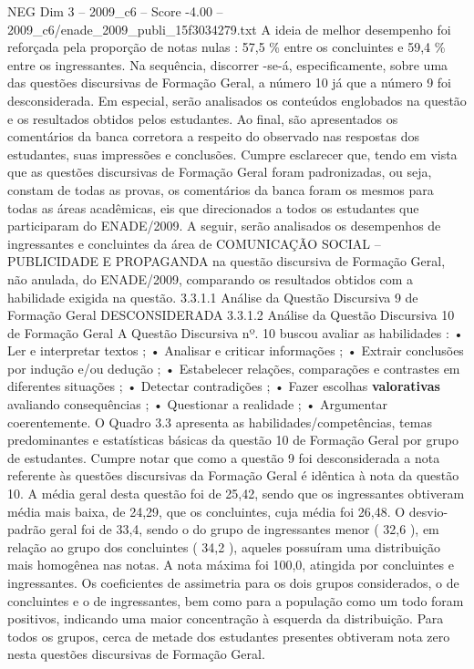 \begin{textsample}{NEG Dim 3 – 2009\_c6 – Score -4.00 – 2009\_c6/enade\_2009\_publi\_15f3034279.txt}
A ideia de melhor desempenho foi reforçada pela proporção de notas nulas : 57,5 \% entre os concluintes e 59,4 \% entre os ingressantes.
Na sequência, discorrer -se-á, especificamente, sobre uma das questões discursivas de Formação Geral, a número 10 já que a número 9 foi desconsiderada.
Em especial, serão analisados os conteúdos englobados na questão e os resultados obtidos pelos estudantes.
Ao final, são apresentados os comentários da banca corretora a respeito do observado nas respostas dos estudantes, suas impressões e conclusões.
Cumpre esclarecer que, tendo em vista que as questões discursivas de Formação Geral foram padronizadas, ou seja, constam de todas as provas, os comentários da banca foram os mesmos para todas as áreas acadêmicas, eis que direcionados a todos os estudantes que participaram do ENADE/2009.
A seguir, serão analisados os desempenhos de ingressantes e concluintes da área de COMUNICAÇÃO SOCIAL – PUBLICIDADE E PROPAGANDA na questão discursiva de Formação Geral, não anulada, do ENADE/2009, comparando os resultados obtidos com a habilidade exigida na questão. 3.3.1.1 Análise da Questão Discursiva 9 de Formação Geral DESCONSIDERADA 3.3.1.2 Análise da Questão Discursiva 10 de Formação Geral A Questão Discursiva nº. 10 buscou avaliar as habilidades : • Ler e interpretar textos ; • Analisar e criticar informações ; • Extrair conclusões por indução e/ou dedução ; • Estabelecer relações, comparações e contrastes em diferentes situações ; • Detectar contradições ; • Fazer escolhas \textbf{valorativas} avaliando consequências ; • Questionar a realidade ; • Argumentar coerentemente.
O Quadro 3.3 apresenta as habilidades/competências, temas predominantes e estatísticas básicas da questão 10 de Formação Geral por grupo de estudantes.
Cumpre notar que como a questão 9 foi desconsiderada a nota referente às questões discursivas da Formação Geral é idêntica à nota da questão 10.
A média geral desta questão foi de 25,42, sendo que os ingressantes obtiveram média mais baixa, de 24,29, que os concluintes, cuja média foi 26,48.
O desvio-padrão geral foi de 33,4, sendo o do grupo de ingressantes menor ( 32,6 ), em relação ao grupo dos concluintes ( 34,2 ), aqueles possuíram uma distribuição mais homogênea nas notas.
A nota máxima foi 100,0, atingida por concluintes e ingressantes.
Os coeficientes de assimetria para os dois grupos considerados, o de concluintes e o de ingressantes, bem como para a população como um todo foram positivos, indicando uma maior concentração à esquerda da distribuição.
Para todos os grupos, cerca de metade dos estudantes presentes obtiveram nota zero nesta questões discursivas de Formação Geral.

\end{textsample}
